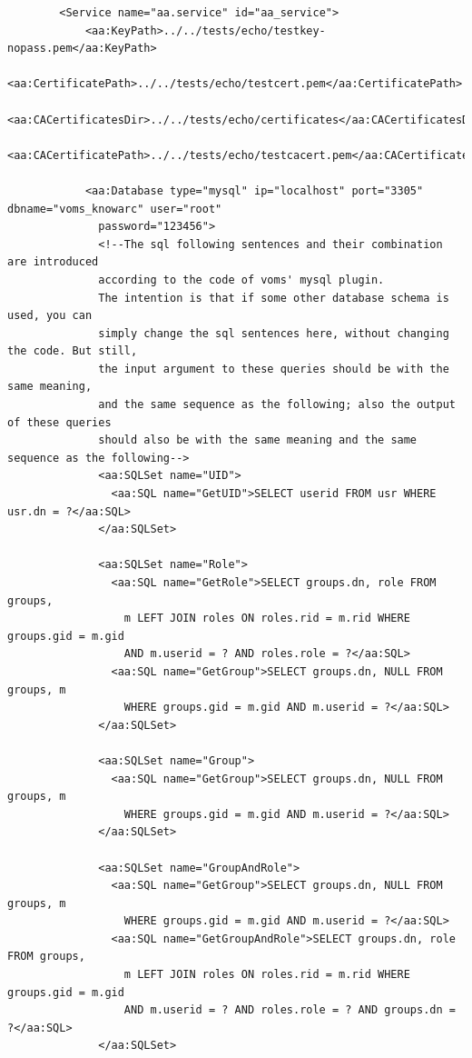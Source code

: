 \documentclass{article}                            %
\begin{document}
\begin{verbatim}
        <Service name="aa.service" id="aa_service">
            <aa:KeyPath>../../tests/echo/testkey-nopass.pem</aa:KeyPath>
            <aa:CertificatePath>../../tests/echo/testcert.pem</aa:CertificatePath>
            <aa:CACertificatesDir>../../tests/echo/certificates</aa:CACertificatesDir>
            <aa:CACertificatePath>../../tests/echo/testcacert.pem</aa:CACertificatePath>

            <aa:Database type="mysql" ip="localhost" port="3305" dbname="voms_knowarc" user="root" 
              password="123456">
              <!--The sql following sentences and their combination are introduced
              according to the code of voms' mysql plugin.
              The intention is that if some other database schema is used, you can
              simply change the sql sentences here, without changing the code. But still,
              the input argument to these queries should be with the same meaning,
              and the same sequence as the following; also the output of these queries
              should also be with the same meaning and the same sequence as the following-->
              <aa:SQLSet name="UID">
                <aa:SQL name="GetUID">SELECT userid FROM usr WHERE usr.dn = ?</aa:SQL>
              </aa:SQLSet>

              <aa:SQLSet name="Role">
                <aa:SQL name="GetRole">SELECT groups.dn, role FROM groups, 
                  m LEFT JOIN roles ON roles.rid = m.rid WHERE groups.gid = m.gid 
                  AND m.userid = ? AND roles.role = ?</aa:SQL>
                <aa:SQL name="GetGroup">SELECT groups.dn, NULL FROM groups, m 
                  WHERE groups.gid = m.gid AND m.userid = ?</aa:SQL>
              </aa:SQLSet>

              <aa:SQLSet name="Group">
                <aa:SQL name="GetGroup">SELECT groups.dn, NULL FROM groups, m 
                  WHERE groups.gid = m.gid AND m.userid = ?</aa:SQL>
              </aa:SQLSet>

              <aa:SQLSet name="GroupAndRole">
                <aa:SQL name="GetGroup">SELECT groups.dn, NULL FROM groups, m 
                  WHERE groups.gid = m.gid AND m.userid = ?</aa:SQL>
                <aa:SQL name="GetGroupAndRole">SELECT groups.dn, role FROM groups, 
                  m LEFT JOIN roles ON roles.rid = m.rid WHERE groups.gid = m.gid 
                  AND m.userid = ? AND roles.role = ? AND groups.dn = ?</aa:SQL>
              </aa:SQLSet>


\end{verbatim}
\end{document}
